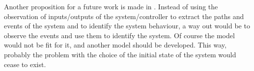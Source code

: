 Another proposition for a future work is made in . Instead
of using the observation of inputs\slash outputs of the system\slash controller
to extract the paths and events of the system and to identify the system
behaviour,
a way out would be to observe the events and use them to identify the
system. Of course the \DAOCT{} model would not be fit for it, and another model
should be developed. This way, probably the problem with the choice of the
initial state of the system would cease to exist.


